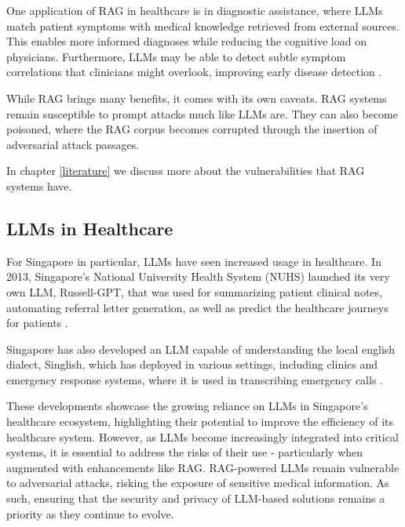 One application of RAG in healthcare is in diagnostic assistance, where LLMs match patient symptoms with medical knowledge retrieved from external sources. This enables more informed diagnoses while reducing the cognitive load on physicians. Furthermore, LLMs may be able to detect subtle symptom correlations that clinicians might overlook, improving early disease detection \autocite{jin2024healthllmpersonalizedretrievalaugmenteddisease}.


While RAG brings many benefits, it comes with its own caveats. RAG systems remain susceptible to prompt attacks much like LLMs are. They can also become poisoned, where the RAG corpus becomes corrupted through the insertion of adversarial attack passages.

In chapter \ref{literature} we discuss more about the vulnerabilities that RAG systems have.

\subsection{LLMs in Healthcare}

For Singapore in particular, LLMs have seen increased usage in healthcare. In 2013, Singapore's National University Health System (NUHS) launched its very own LLM, Russell-GPT, that was used for summarizing patient clinical notes, automating referral letter generation, as well as predict the healthcare journeys for patients \autocite{NUHS_2023}.

Singapore has also developed an LLM capable of understanding the local english dialect, Singlish, which has deployed in various settings, including clinics and emergency response systems, where it is used in transcribing emergency calls \autocite{Chia_2024}.

These developments showcase the growing reliance on LLMs in Singapore's healthcare ecosystem, highlighting their potential to improve the efficiency of its healthcare system. However, as LLMs become increasingly integrated into critical systems, it is essential to address the risks of their use - particularly when augmented with enhancements like RAG. RAG-powered LLMs remain vulnerable to adversarial attacks, risking the exposure of sensitive medical information. As such, ensuring that the security and privacy of LLM-based solutions remains a priority as they continue to evolve.
